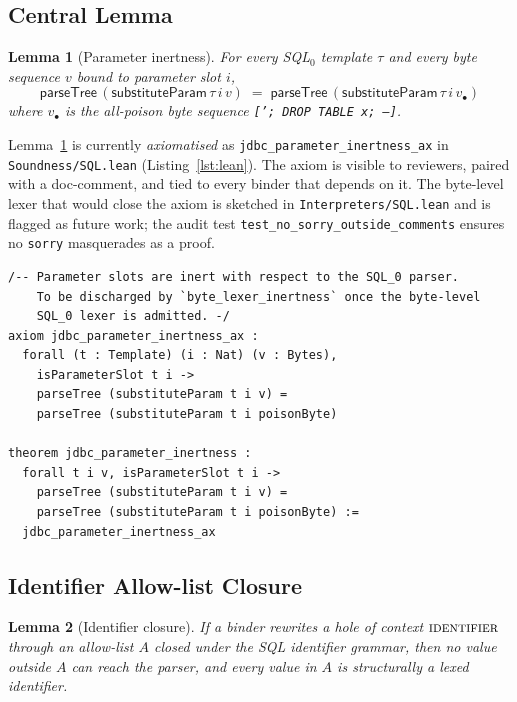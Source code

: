 \documentclass[conference]{IEEEtran}
\newtheorem{lemma}{Lemma}
\begin{document}
\subsection{Central Lemma}

\begin{lemma}[Parameter inertness]\label{lem:inertness}
For every SQL${}_0$ template $\tau$ and every byte
sequence $v$ bound to parameter slot $i$,
\[
\textsf{parseTree}\,(\textsf{substituteParam}\,\tau\, i\, v) \;=\;
\textsf{parseTree}\,(\textsf{substituteParam}\,\tau\, i\, v_\bullet)
\]
where $v_\bullet$ is the all-poison byte sequence
\texttt{['; DROP TABLE x; --]}.
\end{lemma}

Lemma~\ref{lem:inertness} is currently \emph{axiomatised} as
\texttt{jdbc\_parameter\_inertness\_ax} in
\texttt{Soundness/SQL.lean} (Listing~\ref{lst:lean}). The axiom is
visible to reviewers, paired with a doc-comment, and tied to every
binder that depends on it. The byte-level lexer that would close the
axiom is sketched in \texttt{Interpreters/SQL.lean} and is
flagged as future work; the audit test
\texttt{test\_no\_sorry\_outside\_comments} ensures no
\texttt{sorry} masquerades as a proof.

\begin{lstlisting}[style=code,language=Lean,
                   caption={The parameter-inertness axiom and its
                            re-exported theorem.},
                   label={lst:lean},float=t]
/-- Parameter slots are inert with respect to the SQL_0 parser.
    To be discharged by `byte_lexer_inertness` once the byte-level
    SQL_0 lexer is admitted. -/
axiom jdbc_parameter_inertness_ax :
  forall (t : Template) (i : Nat) (v : Bytes),
    isParameterSlot t i ->
    parseTree (substituteParam t i v) =
    parseTree (substituteParam t i poisonByte)

theorem jdbc_parameter_inertness :
  forall t i v, isParameterSlot t i ->
    parseTree (substituteParam t i v) =
    parseTree (substituteParam t i poisonByte) :=
  jdbc_parameter_inertness_ax
\end{lstlisting}

\subsection{Identifier Allow-list Closure}\label{lem:allowlist}

\begin{lemma}[Identifier closure]
If a binder rewrites a hole of context $\textsc{identifier}$
through an allow-list $A$ closed under the SQL identifier grammar,
then no value outside $A$ can reach the parser, and every value in
$A$ is structurally a lexed identifier.
\end{lemma}
\end{document}
